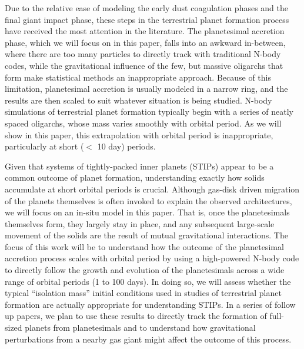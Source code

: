 \documentclass[twocolumn]{aastex63}
\begin{document}
Due to the relative ease of modeling the early dust coagulation phases
and the final giant impact phase, these steps in the terrestrial
planet formation process have received the most attention in the
literature. The planetesimal accretion phase, which we will focus on
in this paper, falls into an awkward in-between, where there are too
many particles to directly track with traditional N-body codes, while
the gravitational influence of the few, but massive oligarchs that
form make statistical methods an inappropriate approach. Because of
this limitation, planetesimal accretion is usually modeled in a narrow
ring, and the results are then scaled to suit whatever situation is being studied. N-body simulations of terrestrial planet formation typically begin with a series of neatly spaced oligarchs, whose mass varies smoothly with orbital period. As we will show in this paper, this extrapolation with orbital period is inappropriate, particularly at short ($<$ 10 day) periods.

Given that systems of tightly-packed inner planets (STIPs) appear to
be a common outcome of planet formation, understanding exactly how
solids accumulate at short orbital periods is crucial. Although
gas-disk driven migration of the planets themselves is often invoked
to explain the observed architectures, we will focus on an in-situ
model in this paper. That is, once the planetesimals themselves form,
they largely stay in place, and any subsequent large-scale movement of
the solids are the result of mutual gravitational interactions. The
focus of this work will be to understand how the outcome of the
planetesimal accretion process scales with orbital period by using a
high-powered N-body code to directly follow the growth and evolution
of the planetesimals across a wide range of orbital periods (1 to 100
days). In doing so, we will assess whether the typical ``isolation
mass'' initial conditions used in studies of terrestrial planet formation are actually appropriate for understanding STIPs. In a series of follow up papers, we plan to use these results to directly track the formation of full-sized planets from planetesimals and to understand how gravitational perturbations from a nearby gas giant might affect the outcome of this process.
\end{document}
